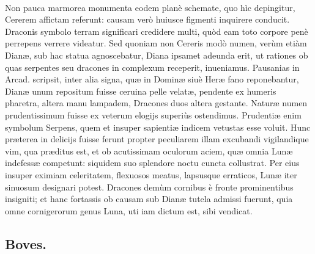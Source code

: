 \documentclass[a4paper, 11pt, oneside, polutonikogreek, latin]{article}
\begin{document}
\paragraph{}
Non pauca marmorea monumenta eodem planè schemate, quo hìc depingitur, Cererem affictam referunt: causam verò huiusce figmenti inquirere conducit. Draconis symbolo terram significari credidere multi, quòd eam toto corpore penè perrepens verrere videatur. Sed quoniam non Cereris modò numen, verùm etiàm Dianæ, sub hac statua agnoscebatur, Diana ipsamet adeunda erit, ut rationes ob quas serpentes seu dracones in complexum receperit, inueniamus. Pausanias in Arcad. scripsit, inter alia signa, quæ in Dominæ siuè Heræ fano reponebantur, Dianæ unum repositum fuisse ceruina pelle velatæ, pendente ex humeris pharetra, altera manu lampadem, Dracones duos altera gestante. Naturæ numen prudentissimum fuisse ex veterum elogijs superiùs ostendimus. Prudentiæ enim symbolum Serpens, quem et insuper sapientiæ indicem vetustas esse voluit. Hunc præterea in delicijs fuisse ferunt propter peculiarem illam excubandi vigilandique vim, qua præditus est, et ob acutissimam oculorum aciem, quæ omnia Lunæ indefessæ competunt: siquidem suo splendore noctu cuncta collustrat. Per eius insuper eximiam celeritatem, flexuosos meatus, lapsusque erraticos, Lunæ iter sinuosum designari potest. Dracones demùm cornibus è fronte prominentibus insigniti; et hanc fortassis ob causam sub Dianæ tutela admissi fuerunt, quia omne cornigerorum genus Luna, uti iam dictum est, sibi vendicat.
\clearpage
\subsection{Boves.}
\end{document}
